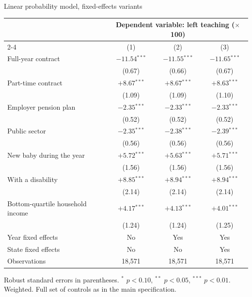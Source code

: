 \documentclass[aspectratio=169,11pt]{beamer}
\newcommand{\backbtn}[1]{\vfill\hfill\hyperlink{#1<1>}{\beamerreturnbutton{back}}}
\begin{document}
\begin{frame}[label=applpm]{Linear probability model, fixed-effects variants}
  \begin{center}
  \scriptsize
  \begin{tabular}{lccc}
    \toprule
      & \multicolumn{3}{c}{Dependent variable: left teaching ($\times$100)} \\
    \cmidrule(lr){2-4}
      & (1) & (2) & (3) \\
    \midrule
    Full-year contract & $-11.54$$^{***}$ & $-11.55$$^{***}$ & $-11.65$$^{***}$ \\
      & (0.67) & (0.66) & (0.67) \\[0.25em]
    Part-time contract & $+8.67$$^{***}$ & $+8.67$$^{***}$ & $+8.63$$^{***}$ \\
      & (1.09) & (1.09) & (1.10) \\[0.25em]
    Employer pension plan & $-2.35$$^{***}$ & $-2.33$$^{***}$ & $-2.33$$^{***}$ \\
      & (0.52) & (0.52) & (0.52) \\[0.25em]
    Public sector & $-2.35$$^{***}$ & $-2.38$$^{***}$ & $-2.39$$^{***}$ \\
      & (0.56) & (0.56) & (0.56) \\[0.25em]
    New baby during the year & $+5.72$$^{***}$ & $+5.63$$^{***}$ & $+5.71$$^{***}$ \\
      & (1.56) & (1.56) & (1.56) \\[0.25em]
    With a disability & $+8.85$$^{***}$ & $+8.94$$^{***}$ & $+8.94$$^{***}$ \\
      & (2.14) & (2.14) & (2.14) \\[0.25em]
    Bottom-quartile household income & $+4.17$$^{***}$ & $+4.13$$^{***}$ & $+4.01$$^{***}$ \\
      & (1.24) & (1.24) & (1.25) \\
    \midrule
    Year fixed effects  & No  & Yes & Yes \\
    State fixed effects & No  & No  & Yes \\
    Observations        & 18,571 & 18,571 & 18,571 \\
    \bottomrule
  \end{tabular}
  \end{center}
  \vspace{0.2em}
  {\tiny Robust standard errors in parentheses.
   $^{*}$ $p<0.10$, $^{**}$ $p<0.05$, $^{***}$ $p<0.01$. Weighted.
   Full set of controls as in the main specification.}
  \backbtn{maineq}
\end{frame}
\end{document}
